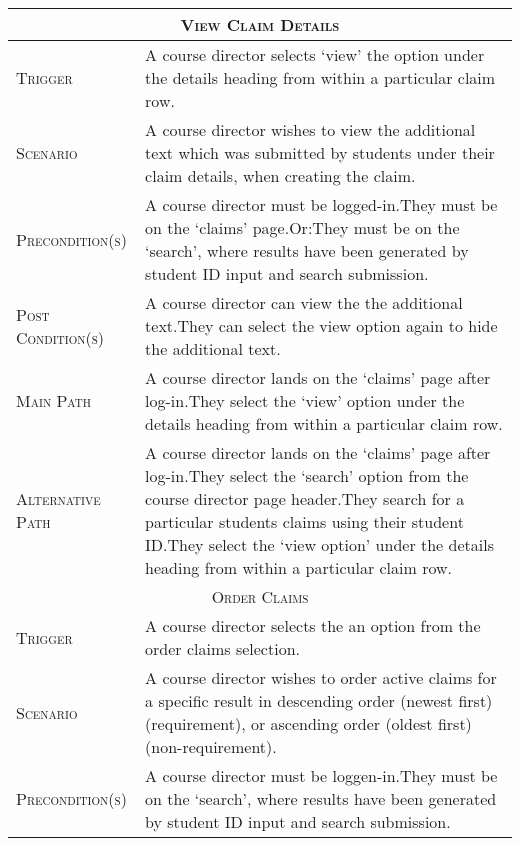 \documentclass[11pt, english]{article}
\begin{document}
\begin{center}
\begin{longtable}{p{3cm}|p{9cm}}
		\hline
		\multicolumn{2}{c}{\textsc{View Claim Details}}\\
		\hline
		\textsc{Trigger} & A course director selects `view' the option under the details heading from within a particular claim row.\\
		\textsc{Scenario} & A course director wishes to view the additional text which was submitted by students under their claim details, when creating the claim.\\
		\textsc{Precondition(s)} & A course director must be logged-in.\newline They must be on the `claims' page.\newline Or:\newline They must be on the `search', where results have been generated by student ID input and search submission.\\
		\textsc{Post Condition(s)} & A course director can view the the additional text.\newline They can select the view option again to hide the additional text.\\
		\textsc{Main Path} & A course director lands on the `claims' page after log-in.\newline They select the `view' option under the details heading from within a particular claim row.\\
		\textsc{Alternative Path} & A course director lands on the `claims' page after log-in.\newline They select the `search' option from the course director page header.\newline They search for a particular students claims using their student ID.\newline They select the `view option' under the details heading from within a particular claim row.\\
		\hline
		\multicolumn{2}{c}{\textsc{Order Claims}}\\
		\hline
		\textsc{Trigger} & A course director selects the an option from the order claims selection.\\
		\textsc{Scenario} & A course director wishes to order active claims for a specific result in descending order (newest first) (requirement), or ascending order (oldest first) (non-requirement).\\
		\textsc{Precondition(s)} & A course director must be loggen-in.\newline They must be on the `search', where results have been generated by student ID input and search submission.\\

\end{longtable}
\end{center}
\end{document}
